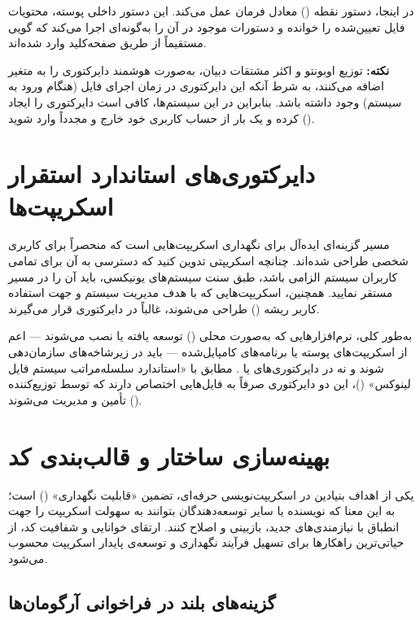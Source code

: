 در اینجا، دستور نقطه () معادل فرمان  عمل می‌کند. این دستور داخلی پوسته، محتویات فایل تعیین‌شده را خوانده و دستورات موجود در آن را به‌گونه‌ای اجرا می‌کند که گویی مستقیماً از طریق صفحه‌کلید وارد شده‌اند.

\begin{note}
\textbf{نکته:} توزیع اوبونتو و اکثر مشتقات دبیان، به‌صورت هوشمند دایرکتوری  را به متغیر  اضافه می‌کنند، به شرط آنکه این دایرکتوری در زمان اجرای فایل  (هنگام ورود به سیستم) وجود داشته باشد. بنابراین در این سیستم‌ها، کافی است دایرکتوری را ایجاد کرده و یک بار از حساب کاربری خود خارج و مجدداً وارد شوید ().
\end{note}

\section{دایرکتوری‌های استاندارد استقرار اسکریپت‌ها}

مسیر  گزینه‌ای ایده‌آل برای نگهداری اسکریپت‌هایی است که منحصراً برای کاربری شخصی طراحی شده‌اند. چنانچه اسکریپتی تدوین کنید که دسترسی به آن برای تمامی کاربران سیستم الزامی باشد، طبق سنت سیستم‌های یونیکسی، باید آن را در مسیر  مستقر نمایید. همچنین، اسکریپت‌هایی که با هدف مدیریت سیستم و جهت استفاده کاربر ریشه () طراحی می‌شوند، غالباً در دایرکتوری  قرار می‌گیرند.

به‌طور کلی، نرم‌افزارهایی که به‌صورت محلی () توسعه یافته یا نصب می‌شوند — اعم از اسکریپت‌های پوسته یا برنامه‌های کامپایل‌شده — باید در زیرشاخه‌های  سازمان‌دهی شوند و نه در دایرکتوری‌های  یا . مطابق با «استاندارد سلسله‌مراتب سیستم فایل لینوکس» ()، این دو دایرکتوری صرفاً به فایل‌هایی اختصاص دارند که توسط توزیع‌کننده () تأمین و مدیریت می‌شوند.

\section{بهینه‌سازی ساختار و قالب‌بندی کد}

یکی از اهداف بنیادین در اسکریپت‌نویسی حرفه‌ای، تضمین «قابلیت نگهداری» () است؛ به این معنا که نویسنده یا سایر توسعه‌دهندگان بتوانند به سهولت اسکریپت را جهت انطباق با نیازمندی‌های جدید، بازبینی و اصلاح کنند. ارتقای خوانایی و شفافیت کد، از حیاتی‌ترین راهکارها برای تسهیل فرآیند نگهداری و توسعه‌ی پایدار اسکریپت محسوب می‌شود.

\subsection{گزینه‌های بلند در فراخوانی آرگومان‌ها}

